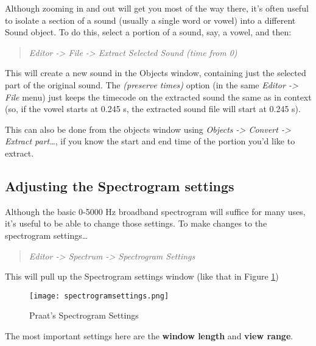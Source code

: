 \documentclass[11pt]{article}
\begin{document}
Although zooming in and out will get you most of the way there, it's
often useful to isolate a section of a sound (usually a single word or
vowel) into a different Sound object. To do this, select a portion of a
sound, say, a vowel, and then:

\begin{quote}
\emph{Editor -\textgreater{} File -\textgreater{} Extract Selected Sound
(time from 0)}
\end{quote}

This will create a new sound in the Objects window, containing just the
selected part of the original sound. The \emph{(preserve times)} option
(in the same \emph{Editor -\textgreater{} File} menu) just keeps the
timecode on the extracted sound the same as in context (so, if the vowel
starts at 0.245 s, the extracted sound file will start at 0.245 s).

This can also be done from the objects window using \emph{Objects
-\textgreater{} Convert -\textgreater{} Extract part\ldots{}}, if you
know the start and end time of the portion you'd like to extract.

\hypertarget{adjusting-the-spectrogram-settings}{%
\subsection{Adjusting the Spectrogram
settings}\label{adjusting-the-spectrogram-settings}}

\label{subsec:spectrogramsettings}

Although the basic 0-5000 Hz broadband spectrogram will suffice for many
uses, it's useful to be able to change those settings. To make changes
to the spectrogram settings\ldots{}

\begin{quote}
\emph{Editor -\textgreater{} Spectrum -\textgreater{} Spectrogram
Settings}
\end{quote}

This will pull up the Spectrogram settings window (like that in Figure
\ref{spectrogramsettings})

\begin{figure}
  \centerline{
    \mbox{\texttt{[image: spectrogramsettings.png]}}
  }
  \caption{Praat's Spectrogram Settings \label{spectrogramsettings}}

  \end{figure}

The most important settings here are the \textbf{window length} and
\textbf{view range}.
\end{document}
